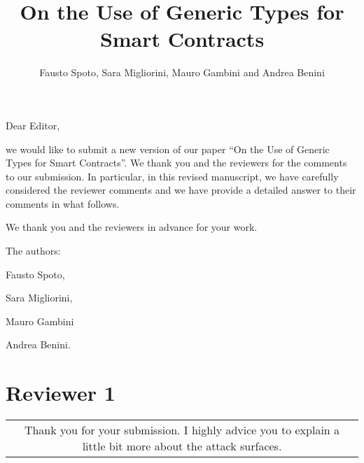 \documentclass[journal,onecolumn, 11pt]{IEEEtran}
\newcommand{\BOX}[1]
{
  {\it
    \begin{center}
      \begin{tabular}{|c|}
        \hline
        \parbox{0.97\columnwidth}{
          \medskip
          #1
          \medskip} \\
        \hline
      \end{tabular}
    \end{center}
  }
}
\begin{document}
\title{{\LARGE On the Use of Generic Types for Smart Contracts}}

\author{{\normalsize Fausto Spoto, Sara Migliorini, Mauro Gambini and Andrea Benini
\\}}

\date{}

\maketitle



Dear Editor,

\vspace{2mm}

we would like to submit a new version of our paper ``On the Use of Generic Types for Smart Contracts''. We thank you and the reviewers for the comments to our submission. In particular, in this revised manuscript, we have carefully considered the reviewer comments and we have provide a detailed answer to their comments in what follows.

\vspace{5mm}

We thank you and the reviewers in advance for your work.
\vspace{5mm}

        \hspace{7cm} The authors:
\vspace{5mm}

                \hspace{7cm} Fausto Spoto, 

                \hspace{7cm} Sara Migliorini, 

                \hspace{7cm} Mauro Gambini 
                
                \hspace{7cm} Andrea Benini.

\newpage


\section*{\textbf{Reviewer 1}}

\BOX{
Thank you for your submission. I highly advice you to explain a little bit more about the attack surfaces.
}
\end{document}
